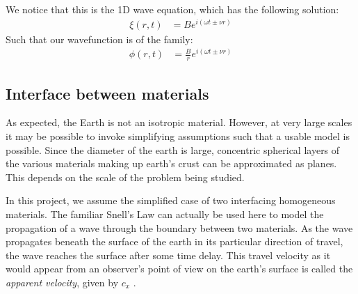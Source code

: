 We notice that this is the 1D wave equation, which has the following solution:
\begin{align*}
    \xi(r,t) &= Be^{i(\omega t \pm \nu r)}
\end{align*}
Such that our wavefunction is of the family:
\begin{align}
    \phi(r,t) &= \frac{B}{r}e^{i(\omega t \pm \nu r)}
\end{align}



\subsection{Interface between materials}
As expected, the Earth is not an isotropic material. However, at very large scales it may be possible to invoke simplifying assumptions such that a usable model is possible. Since the diameter of the earth is large, concentric spherical layers of the various materials making up earth's crust can be approximated as planes. This depends on the scale of the problem being studied.  %

In this project, we assume the simplified case of two interfacing homogeneous materials. The familiar Snell's Law can actually be used here to model the propagation of a wave through the boundary between two materials.
As the wave propagates beneath the surface of the earth in its particular direction of travel, the wave reaches the surface after some time delay. This travel velocity as it would appear from an observer's point of view on the earth's surface is called the \textit{apparent velocity}, given by $c_x$ \cite[65]{stein2009introduction}.

